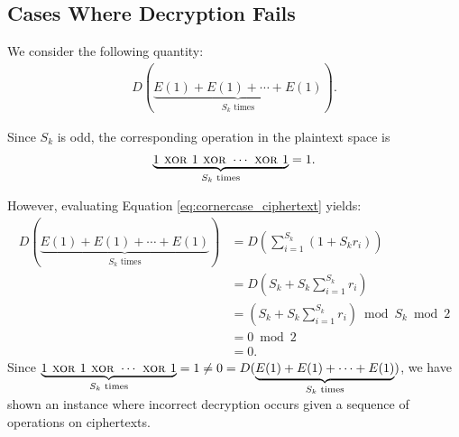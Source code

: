 \subsection{Cases Where Decryption Fails}
We consider the following quantity:
\begin{align}
	\label{eq:cornercase_ciphertext}
	D(\underbrace{E(1)+E(1)+\cdots+E(1)}_{S_k \text{ times}}).
\end{align}

Since $S_k$ is odd, the corresponding operation in the plaintext space is
\begin{align*}
	\label{eq:cornercase_plaintext}
	\underbrace{1 \textsc{ xor } 1 \textsc{ xor } \cdots \textsc{ xor } 1}_{S_k \text{ times}} = 1.
\end{align*}

However, evaluating Equation \ref{eq:cornercase_ciphertext} yields:
\begin{align*}
	D(\underbrace{E(1)+E(1)+\cdots+E(1)}_{S_k \text{ times}})
	&= D\left(\sum_{i=1}^{S_k}{(1+S_kr_i)}\right)\\
	&= D\left(S_k + S_k\sum_{i=1}^{S_k}{r_i}\right)\\
	&= \left(S_k + S_k\sum_{i=1}^{S_k}{r_i}\right) \bmod S_k \bmod 2\\
	&= 0 \bmod 2\\
	&= 0.
\end{align*}
Since $\underbrace{1 \textsc{ xor } 1 \textsc{ xor } \cdots \textsc{ xor } 1}_{S_k \text{ times}} = 1\neq 0 = D(\underbrace{E(1)+E(1)+\cdots+E(1)}_{S_k \text{ times}})$, we have shown an instance where incorrect decryption occurs given a sequence of operations on ciphertexts.

